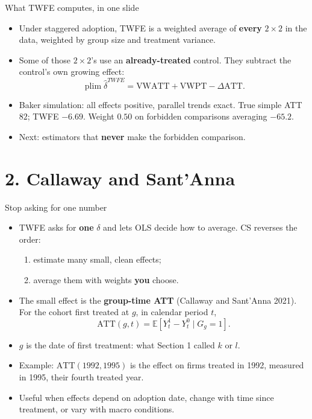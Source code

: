 \documentclass[
  11pt,
  ignorenonframetext,
  aspectratio=169,
]{beamer}
\providecommand{\tightlist}{%
  \setlength{\itemsep}{0pt}\setlength{\parskip}{0pt}}
\begin{document}
\begin{frame}{What TWFE computes, in one slide}
\protect{}\label{what-twfe-computes-in-one-slide}
\begin{itemize}
\tightlist
\item
  Under staggered adoption, TWFE is a weighted average of \textbf{every}
  \(2 \times 2\) in the data, weighted by group size and treatment
  variance.
\item
  Some of those \(2 \times 2\)'s use an \textbf{already-treated}
  control. They subtract the control's own growing effect: \[
  \operatorname{plim}\hat\delta^{TWFE} = \text{VWATT} + \text{VWPT} - \Delta\text{ATT}.
  \]
\item
  Baker simulation: all effects positive, parallel trends exact. True
  simple ATT \(82\); TWFE \(-6.69\). Weight \(0.50\) on forbidden
  comparisons averaging \(-65.2\).
\end{itemize}

\vspace{0.4em}

\begin{itemize}
\tightlist
\item
  Next: estimators that \textbf{never} make the forbidden comparison.
\end{itemize}
\end{frame}

\section{2. Callaway and Sant'Anna}\label{callaway-and-santanna}

\begin{frame}{Stop asking for one number}
\protect{}\label{stop-asking-for-one-number}
\begin{itemize}
\tightlist
\item
  TWFE asks for \textbf{one} \(\delta\) and lets OLS decide how to
  average. CS reverses the order:

  \begin{enumerate}
  \tightlist
  \item
    estimate many small, clean effects;
  \item
    average them with weights \textbf{you} choose.
  \end{enumerate}
\item
  The small effect is the \textbf{group-time ATT} (Callaway and
  Sant'Anna 2021). For the cohort first treated at \(g\), in calendar
  period \(t\), \[
  \text{ATT}(g, t) = \mathbb{E}[Y^1_t - Y^0_t \mid G_g = 1].
  \]
\item
  \(g\) is the date of first treatment: what Section 1 called \(k\) or
  \(l\).
\item
  Example: \(\text{ATT}(1992, 1995)\) is the effect on firms treated in
  1992, measured in 1995, their fourth treated year.
\item
  Useful when effects depend on adoption date, change with time since
  treatment, or vary with macro conditions.
\end{itemize}
\end{frame}
\end{document}
